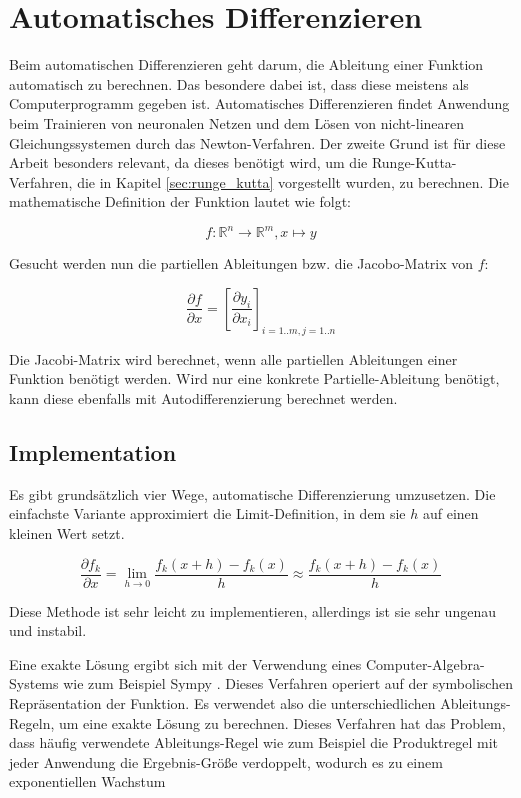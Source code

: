 
\section{Automatisches Differenzieren} \label{sec:auto_diffentiation}

Beim automatischen Differenzieren \cite[Kapitel~2]{autodiff} geht darum, die Ableitung einer Funktion automatisch zu berechnen.
Das besondere dabei ist, dass diese meistens als Computerprogramm gegeben ist.
Automatisches Differenzieren findet Anwendung beim Trainieren von neuronalen Netzen 
und dem Lösen von nicht-linearen Gleichungssystemen durch das Newton-Verfahren.
Der zweite Grund ist für diese Arbeit besonders relevant, da 
dieses benötigt wird, um die Runge-Kutta-Verfahren, die in Kapitel \ref{sec:runge_kutta} vorgestellt wurden, zu berechnen.
Die mathematische Definition der Funktion lautet wie folgt:

$$
f: \mathbb{R}^n \rightarrow \mathbb{R}^m, x \mapsto y
$$

Gesucht werden nun die partiellen Ableitungen bzw. die Jacobo-Matrix von $f$:

$$
\frac{\partial f}{\partial x} = \left[ \frac{\partial y_i}{\partial x_i} \right]_{i=1..m, j=1..n} 
$$

Die Jacobi-Matrix wird berechnet, wenn alle partiellen Ableitungen einer Funktion benötigt werden.
Wird nur eine konkrete Partielle-Ableitung benötigt, kann diese ebenfalls mit Autodifferenzierung berechnet werden.

\subsection{Implementation} \label{sec:implementation}

Es gibt grundsätzlich vier Wege, automatische Differenzierung umzusetzen.
Die einfachste Variante approximiert die Limit-Definition, in dem sie $h$ auf einen kleinen Wert setzt.


$$
\frac{\partial f_k}{\partial x} = \lim_{h \to 0} \frac{f_k(x+ h) - f_k(x)}{h} \approx \frac{f_k(x + h) - f_k(x)}{h} 
$$

Diese Methode ist sehr leicht zu implementieren, allerdings ist sie sehr ungenau und instabil.

Eine exakte Lösung ergibt sich mit der Verwendung eines Computer-Algebra-Systems wie zum Beispiel Sympy \cite{sympy}.
Dieses Verfahren operiert auf der symbolischen Repräsentation der Funktion.
Es verwendet also die unterschiedlichen Ableitungs-Regeln, um eine exakte Lösung zu berechnen.
Dieses Verfahren hat das Problem, dass häufig verwendete Ableitungs-Regel wie zum Beispiel die Produktregel
mit jeder Anwendung die Ergebnis-Größe verdoppelt, wodurch es zu einem exponentiellen Wachstum 

